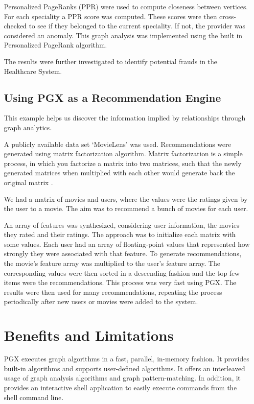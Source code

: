 \documentclass[9pt,twocolumn,twoside]{../../styles/osajnl}
\begin{document}
Personalized PageRanks (PPR) were used to compute closeness between
vertices. For each speciality a PPR score was computed. These scores
were then cross-checked to see if they belonged to the current
speciality. If not, the provider was considered an anomaly. This graph
analysis was implemented using the built in Personalized PageRank
algorithm.

The results were further investigated to identify potential frauds in
the Healthcare System.

\subsection{Using PGX as a Recommendation Engine}
This example helps us discover the information implied by
relationships through graph analytics.

A publicly available data set ‘MovieLens’ was used.  Recommendations
were generated using matrix factorization algorithm. Matrix
factorization is a simple process, in which you factorize a matrix
into two matrices, such that the newly generated matrices when
multiplied with each other would generate back the original matrix
\cite{www-rec}.

We had a matrix of movies and users, where the values were the ratings
given by the user to a movie. The aim was to recommend a bunch of
movies for each user.

An array of features was synthesized, considering user information,
the movies they rated and their ratings. The approach was to
initialize each matrix with some values. Each user had an array of
floating-point values that represented how strongly they were
associated with that feature. To generate recommendations, the movie’s
feature array was multiplied to the user’s feature array. The
corresponding values were then sorted in a descending fashion and the
top few items were the recommendations. This process was very fast
using PGX. The results were then used for many recommendations,
repeating the process periodically after new users or movies were
added to the system.


\section{Benefits and Limitations}
PGX executes graph algorithms in a fast, parallel, in-memory
fashion. It provides built-in algorithms and supports user-defined
algorithms. It offers an interleaved usage of graph analysis
algorithms and graph pattern-matching. In addition, it provides an
interactive shell application to easily execute commands from the
shell command line.
\end{document}
